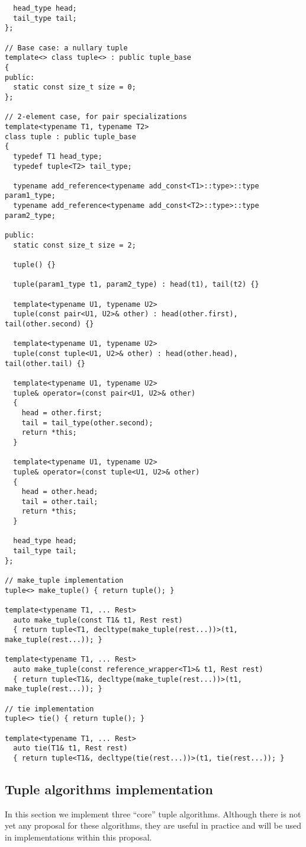 \documentclass{article}
\begin{document}
\begin{verbatim}
  head_type head;
  tail_type tail;
};

// Base case: a nullary tuple
template<> class tuple<> : public tuple_base 
{
public:
  static const size_t size = 0;
};

// 2-element case, for pair specializations
template<typename T1, typename T2>
class tuple : public tuple_base 
{
  typedef T1 head_type;
  typedef tuple<T2> tail_type;

  typename add_reference<typename add_const<T1>::type>::type param1_type;
  typename add_reference<typename add_const<T2>::type>::type param2_type;

public:
  static const size_t size = 2;

  tuple() {}

  tuple(param1_type t1, param2_type) : head(t1), tail(t2) {}

  template<typename U1, typename U2>
  tuple(const pair<U1, U2>& other) : head(other.first), tail(other.second) {}

  template<typename U1, typename U2>
  tuple(const tuple<U1, U2>& other) : head(other.head), tail(other.tail) {}

  template<typename U1, typename U2>
  tuple& operator=(const pair<U1, U2>& other)
  {
    head = other.first;
    tail = tail_type(other.second);
    return *this;
  }

  template<typename U1, typename U2>
  tuple& operator=(const tuple<U1, U2>& other)
  {
    head = other.head;
    tail = other.tail;
    return *this;
  }

  head_type head;
  tail_type tail;
};

// make_tuple implementation
tuple<> make_tuple() { return tuple(); }

template<typename T1, ... Rest> 
  auto make_tuple(const T1& t1, Rest rest)
  { return tuple<T1, decltype(make_tuple(rest...))>(t1, make_tuple(rest...)); }

template<typename T1, ... Rest> 
  auto make_tuple(const reference_wrapper<T1>& t1, Rest rest)
  { return tuple<T1&, decltype(make_tuple(rest...))>(t1, make_tuple(rest...)); }

// tie implementation
tuple<> tie() { return tuple(); }

template<typename T1, ... Rest> 
  auto tie(T1& t1, Rest rest)
  { return tuple<T1&, decltype(tie(rest...))>(t1, tie(rest...)); }
\end{verbatim}
\normalsize

\subsection{Tuple algorithms implementation}
In this section we implement three ``core'' tuple algorithms.
Although there is not yet any proposal for these algorithms, they are
useful in practice and will be used in implementations within this
proposal.
\end{document}
